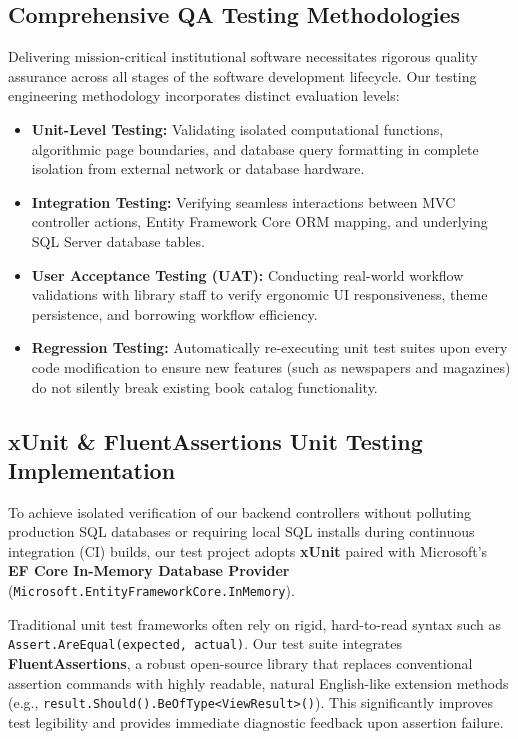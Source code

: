 \documentclass[10pt,journal,compsoc]{IEEEtran}
\begin{document}
\subsection{Comprehensive QA Testing Methodologies}
Delivering mission-critical institutional software necessitates rigorous quality assurance across all stages of the software development lifecycle. Our testing engineering methodology incorporates distinct evaluation levels:
\begin{itemize}[leftmargin=1.5em]
    \item \textbf{Unit-Level Testing:} Validating isolated computational functions, algorithmic page boundaries, and database query formatting in complete isolation from external network or database hardware.
    \item \textbf{Integration Testing:} Verifying seamless interactions between MVC controller actions, Entity Framework Core ORM mapping, and underlying SQL Server database tables.
    \item \textbf{User Acceptance Testing (UAT):} Conducting real-world workflow validations with library staff to verify ergonomic UI responsiveness, theme persistence, and borrowing workflow efficiency.
    \item \textbf{Regression Testing:} Automatically re-executing unit test suites upon every code modification to ensure new features (such as newspapers and magazines) do not silently break existing book catalog functionality.
\end{itemize}

\subsection{xUnit \& FluentAssertions Unit Testing Implementation}
To achieve isolated verification of our backend controllers without polluting production SQL databases or requiring local SQL installs during continuous integration (CI) builds, our test project adopts \textbf{xUnit} paired with Microsoft's \textbf{EF Core In-Memory Database Provider} (\texttt{Microsoft.EntityFrameworkCore.InMemory}).

Traditional unit test frameworks often rely on rigid, hard-to-read syntax such as \texttt{Assert.AreEqual(expected, actual)}. Our test suite integrates \textbf{FluentAssertions}, a robust open-source library that replaces conventional assertion commands with highly readable, natural English-like extension methods (e.g., \texttt{result.Should().BeOfType<ViewResult>()}). This significantly improves test legibility and provides immediate diagnostic feedback upon assertion failure.
\end{document}
